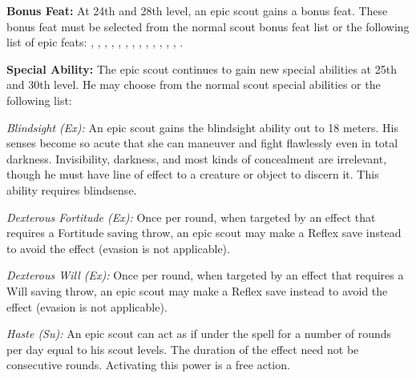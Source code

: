 \textbf{Bonus Feat:} At 24th and 28th level, an epic scout gains a bonus feat. These bonus feat must be selected from the normal scout bonus feat list or the following list of epic feats:
,
,
,
,
,
,
,
,
,
,
,
,
,
.

\textbf{Special Ability:} The epic scout continues to gain new special abilities at 25th and 30th level. He may choose from the normal scout special abilities or the following list:

\textit{Blindsight (Ex):} An epic scout gains the blindsight ability out to 18 meters. His senses become so acute that she can maneuver and fight flawlessly even in total darkness. Invisibility, darkness, and most kinds of concealment are irrelevant, though he must have line of effect to a creature or object to discern it. This ability requires blindsense.

\textit{Dexterous Fortitude (Ex):} Once per round, when targeted by an effect that requires a Fortitude saving throw, an epic scout may make a Reflex save instead to avoid the effect (evasion is not applicable).

\textit{Dexterous Will (Ex):} Once per round, when targeted by an effect that requires a Will saving throw, an epic scout may make a Reflex save instead to avoid the effect (evasion is not applicable).

\textit{Haste (Su):} An epic scout can act as if under the  spell for a number of rounds per day equal to \onefifth his scout levels. The duration of the effect need not be consecutive rounds. Activating this power is a free action.
